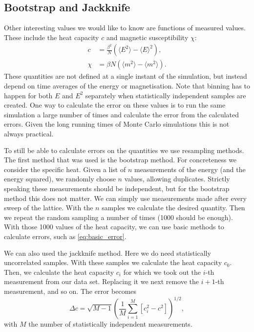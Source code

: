 \documentclass[11pt, a4paper]{report} %
\begin{document}
\subsection{Bootstrap and Jackknife}
Other interesting values we would like to know are functions of measured values.
These include the heat capacity \(c\) and magnetic susceptibility \(\chi\):
\begin{align}
	c &= \frac{\beta^2}{N} \left(\langle E^2 \rangle - \langle E \rangle^2 \right), \\
	\chi &= \beta N \left( \langle m^2 \rangle - \langle m^2 \rangle \right).
\end{align}
These quantities are not defined at a single instant of the simulation, but instead depend on time averages of the energy or magnetisation.
Note that binning has to happen for both \(E\) and \(E^2\) separately when statistically independent samples are created.
One way to calculate the error on these values is to run the same simulation a large number of times and calculate the error from the calculated errors.
Given the long running times of Monte Carlo simulations this is not always practical.

To still be able to calculate errors on the quantities we use resampling methods.
The first method that was used is the bootstrap method.
For concreteness we consider the specific heat.
Given a list of \(n\) measurements of the energy (and the energy squared), we randomly choose \(n\) values, allowing duplicates.
Strictly speaking these measurements should be independent, but for the bootstrap method this does not matter.
We can simply use measurements made after every sweep of the lattice.
With the \(n\) samples we calculate the desired quantity.
Then we repeat the random sampling a number of times (1000 should be enough).
With those 1000 values of the heat capacity, we can use basic methods to calculate errors, such as \cref{eq:basic_error}.\cite{newman:1999}

We can also used the jackknife method.
Here we do need statistically uncorrelated samples.
With these samples we calculate the heat capacity \(c_0\).
Then, we calculate the heat capacity \(c_i\) for which we took out the \(i\)-th measurement from our data set.
Replacing it we next remove the \(i+1\)-th measurement, and so on.\cite{newman:1999}
The error becomes\cite{corboz}
\begin{equation}
	\Delta c = \sqrt{M-1}\left( \frac{1}{M} \sum_{i=1}^M \left[c_i^2 - c^2\right] \right)^{1/2},
\end{equation}
with \(M\) the number of statistically independent measurements.
\end{document}
